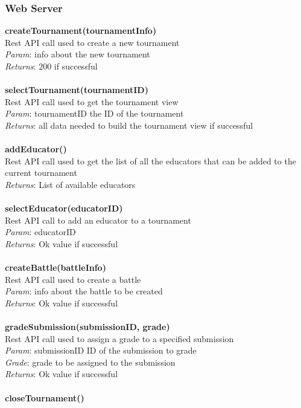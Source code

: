 \documentclass{article}
\begin{document}
\subsubsection{Web Server}
\textbf{createTournament(tournamentInfo)}\\
Rest API call used to create a new tournament\\
\textit{Param}: info about the new tournament\\
\textit{Returns}: 200 if successful\\
\\
\textbf{selectTournament(tournamentID)}\\
Rest API call used to get the tournament view\\
\textit{Param}: tournamentID the ID of the tournament\\
\textit{Returns}: all data needed to build the tournament view if successful\\
\\
\textbf{addEducator()}\\
Rest API call used to get the list of all the educators that can be added to the current tournament\\
\textit{Returns}: List of available educators\\
\\
\textbf{selectEducator(educatorID)}\\
Rest API call to add an educator to a tournament\\
\textit{Param}: educatorID\\
\textit{Returns}: Ok value if successful\\
\\
\textbf{createBattle(battleInfo)}\\
Rest API call used to create a battle\\
\textit{Param}: info about the battle to be created\\
\textit{Returns}: Ok value if successful\\
\\
\textbf{gradeSubmission(submissionID, grade)}\\
Rest API call used to assign a grade to a specified submission\\
\textit{Param}: submissionID ID of the submission to grade\\
\textit{Grade}: grade to be assigned to the submission\\
\textit{Returns}: Ok value if successful\\
\\
\textbf{closeTournament()}\\
\end{document}
